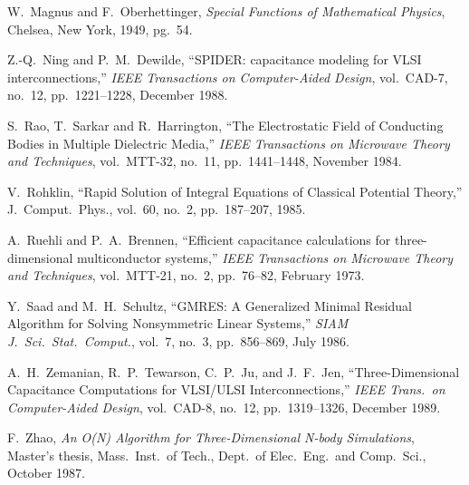 \begin{thebibliography}{[xx]}

W.\ Magnus and F.\ Oberhettinger, {\em Special Functions of Mathematical
Physics}, Chelsea, New York, 1949, pg.\ 54.

Z.-Q.\ Ning and P.\ M.\ Dewilde, ``SPIDER: capacitance modeling for VLSI 
interconnections,''
{\em IEEE Transactions on Computer-Aided Design}, vol.\ CAD-7, no.\ 12, 
pp.\ 1221--1228, December 1988.

S.\ Rao, T.\ Sarkar and R.\ Harrington, ``The Electrostatic Field of Conducting
Bodies in Multiple Dielectric Media,''
{\em IEEE Transactions on Microwave Theory and Techniques}, vol.\ MTT-32,
no.\ 11, pp.\ 1441--1448, November 1984.

V.\ Rohklin, ``Rapid Solution of Integral Equations of Classical Potential 
Theory,'' J.\ Comput.\ Phys., vol.\ 60, no.\ 2, pp.\ 187--207, 1985.

A.\ Ruehli and P.\ A.\ Brennen, ``Efficient capacitance calculations for 
three-dimensional multiconductor systems,''
{\em IEEE Transactions on Microwave Theory and Techniques}, vol.\ MTT-21,
no.\ 2, pp.\ 76--82, February 1973.

Y.\ Saad and M.\ H.\ Schultz,
``GMRES: A Generalized Minimal Residual Algorithm for Solving Nonsymmetric
Linear Systems,''
{\em SIAM J.\ Sci.\ Stat.\ Comput.}, vol.\ 7, no.\ 3, pp.\ 856--869, July 1986.

A.\ H.\ Zemanian, R.\ P.\ Tewarson, C.\ P.\ Ju, and J.\ F.\ Jen,
``Three-Dimensional Capacitance Computations for VLSI/ULSI Interconnections,''
{\em IEEE Trans.\ on Computer-Aided Design}, vol.\ CAD-8, no.\ 12, 
pp.\ 1319--1326, December 1989.

F.\ Zhao, {\em An O(N) Algorithm for Three-Dimensional N-body Simulations},
Master's thesis, Mass.\ Inst.\ of Tech., Dept.\ of Elec.\ Eng.\ and 
Comp.\ Sci., October 1987.

\end{thebibliography}
